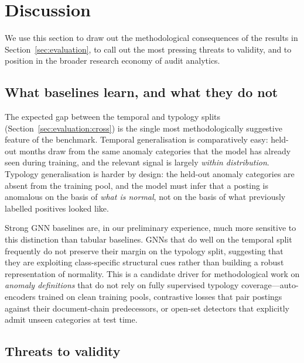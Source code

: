 \section{Discussion}
\label{sec:discussion}

We use this section to draw out the methodological consequences of
the results in Section~\ref{sec:evaluation}, to call out the most
pressing threats to validity, and to position \bench{} in the
broader research economy of audit analytics.

\subsection{What baselines learn, and what they do not}
\label{sec:discussion:learn}

The expected gap between the temporal and typology splits
(Section~\ref{sec:evaluation:cross}) is the single most
methodologically suggestive feature of the benchmark.  Temporal
generalisation is comparatively easy: held-out months draw from the
same anomaly categories that the model has already seen during
training, and the relevant signal is largely \emph{within
distribution}.  Typology generalisation is harder by design: the
held-out anomaly categories are absent from the training pool, and
the model must infer that a posting is anomalous on the basis of
\emph{what is normal}, not on the basis of what previously labelled
positives looked like.

Strong GNN baselines are, in our preliminary experience, much more
sensitive to this distinction than tabular baselines.  GNNs that
do well on the temporal split frequently do not preserve their
margin on the typology split, suggesting that they are exploiting
class-specific structural cues rather than building a robust
representation of normality.  This is a candidate driver for
methodological work on \emph{anomaly definitions} that do not rely
on fully supervised typology coverage---auto-encoders trained on
clean training pools, contrastive losses that pair postings against
their document-chain predecessors, or open-set detectors that
explicitly admit unseen categories at test time.

\subsection{Threats to validity}
\label{sec:discussion:threats}


